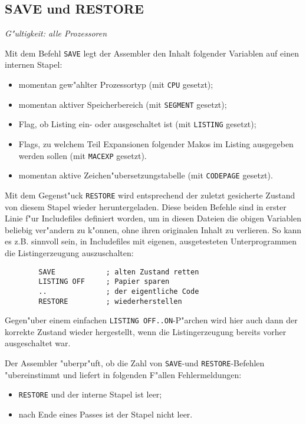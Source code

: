 \documentclass[12pt,a4paper,twoside]{report}
\makeatletter
\newcommand{\tty}[1]{{\tt #1}}
\newcommand{\ttindex}[1]{\index{#1@{\tt #1}}}
\makeatother
\begin{document}
{%

\subsection{SAVE und RESTORE}
\ttindex{SAVE}\ttindex{RESTORE}

{\em G"ultigkeit: alle Prozessoren}

Mit dem Befehl \tty{SAVE} legt der Assembler den Inhalt folgender
Variablen auf einen internen Stapel:
\begin{itemize}
\item{momentan gew"ahlter Prozessortyp (mit \tty{CPU} gesetzt);}
\item{momentan aktiver Speicherbereich (mit \tty{SEGMENT} gesetzt);}
\item{Flag, ob Listing ein- oder ausgeschaltet ist (mit \tty{LISTING}
      gesetzt);}
\item{Flags, zu welchem Teil Expansionen folgender Makos im Listing
      ausgegeben werden sollen (mit \tty{MACEXP} gesetzt).}
\item{momentan aktive Zeichen"ubersetzungstabelle (mit \tty{CODEPAGE}
      gesetzt).}
\end{itemize}
Mit dem Gegenst"uck \tty{RESTORE} wird entsprechend der zuletzt
gesicherte Zustand von diesem Stapel wieder heruntergeladen.  Diese beiden
Befehle sind in erster Linie f"ur Includefiles definiert worden, um
in diesen Dateien die obigen Variablen beliebig ver"andern zu k"onnen,
ohne ihren originalen Inhalt zu verlieren.  So kann es z.B. sinnvoll sein,
in Includefiles mit eigenen, ausgetesteten Unterprogrammen die
Listingerzeugung auszuschalten:
\begin{verbatim}
        SAVE            ; alten Zustand retten
        LISTING OFF     ; Papier sparen
        ..              ; der eigentliche Code
        RESTORE         ; wiederherstellen
\end{verbatim}
Gegen"uber einem einfachen \tty{LISTING OFF..ON}-P"archen wird hier
auch dann der korrekte Zustand wieder hergestellt, wenn die Listingerzeugung
bereits vorher ausgeschaltet war.
\par
Der Assembler "uberpr"uft, ob die Zahl von \tty{SAVE}-und \tty{RESTORE}-Befehlen
"ubereinstimmt und liefert in folgenden F"allen Fehlermeldungen:
\begin{itemize}
\item{\tty{RESTORE} und der interne Stapel ist leer;}
\item{nach Ende eines Passes ist der Stapel nicht leer.}
\end{itemize}

}
\end{document}
